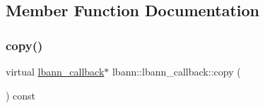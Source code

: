 \subsection{Member Function Documentation}
\mbox{\label{classlbann_1_1lbann__callback_a9f545d1269a8c7af335625d049691f26}} 
\subsubsection{\texorpdfstring{copy()}{copy()}}
{\footnotesize\ttfamily virtual \hyperlink{classlbann_1_1lbann__callback}{lbann\+\_\+callback}$\ast$ lbann\+::lbann\+\_\+callback\+::copy (\begin{DoxyParamCaption}{ }\end{DoxyParamCaption}) const\hspace{0.3cm}{\ttfamily [pure virtual]}}



